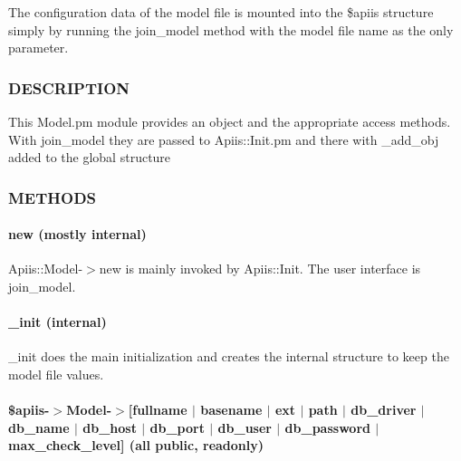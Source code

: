 The configuration data of the model file is mounted into the \$apiis
structure simply by running the join\_model method with the model file name
as the only parameter.

\subsubsection*{DESCRIPTION\label{Apiis::Model_--_methods_to_access_the_model_file_data_via_the_apiis_structure_DESCRIPTION}}


This Model.pm module provides an object and the appropriate access methods.
With join\_model they are passed to Apiis::Init.pm and there with \_add\_obj
added to the global structure

\subsubsection*{METHODS\label{Apiis::Model_--_methods_to_access_the_model_file_data_via_the_apiis_structure_METHODS}}
\paragraph*{new (mostly internal)\label{Apiis::Model_--_methods_to_access_the_model_file_data_via_the_apiis_structure_new_mostly_internal_}}


Apiis::Model-$>$new is mainly invoked by Apiis::Init. The user interface is
join\_model.

\paragraph*{\_init (internal)\label{Apiis::Model_--_methods_to_access_the_model_file_data_via_the_apiis_structure__init_internal_}}


\_init does the main initialization and creates the internal structure to
keep the model file values.

\paragraph*{\$apiis-$>$Model-$>$[fullname $|$ basename $|$ ext $|$ path $|$ db\_driver $|$ db\_name
$|$ db\_host $|$ db\_port $|$ db\_user $|$ db\_password $|$ max\_check\_level] (all public, readonly)\label{Apiis::Model_--_methods_to_access_the_model_file_data_via_the_apiis_structure__apiis-_Model-_fullname_basename_ext_path_db_driver_db_name_db_host_db_port_db_user_db_password_max_check_level_all_public_readonly_}}


